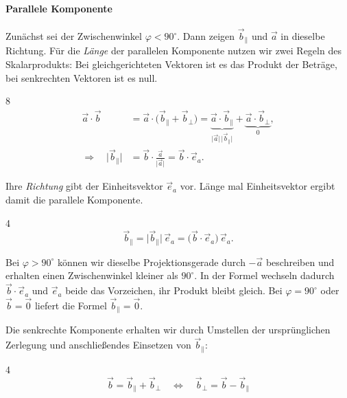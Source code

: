 \paragraph{Parallele Komponente}
Zunächst sei der Zwischenwinkel $\varphi<90^\circ$. Dann zeigen
$\vec b_{\parallel}$ und $\vec a$ in dieselbe Richtung.
Für die \emph{Länge} der parallelen Komponente nutzen wir zwei Regeln des
Skalarprodukts: Bei gleichgerichteten Vektoren ist es das Produkt der
Beträge, bei senkrechten Vektoren ist es null.
\begin{ClozeArea}[34]{8}
  \[
    \begin{aligned}
      \vec a\cdot\vec b
        &=\vec a\cdot\bigl(\vec b_{\parallel}+\vec b_{\perp}\bigr)
         =\underbrace{\vec a\cdot\vec b_{\parallel}}_{
            \lvert\vec a\rvert\,\lvert\vec b_{\parallel}\rvert}
          +\underbrace{\vec a\cdot\vec b_{\perp}}_{0}, \\[1em]
      \Longrightarrow\quad \lvert\vec b_{\parallel}\rvert
        &=\vec b\cdot\frac{\vec a}{\lvert\vec a\rvert}
         =\vec b\cdot\vec e_a.
    \end{aligned}
  \]
\end{ClozeArea}
Ihre \emph{Richtung} gibt der Einheitsvektor $\vec e_a$ vor. Länge mal
Einheitsvektor ergibt damit die parallele Komponente.
\begin{ClozeArea}[34]{4}
  \[
    \vec b_{\parallel}
      =\lvert\vec b_{\parallel}\rvert\,\vec e_a
      =\bigl(\vec b\cdot\vec e_a\bigr)\,\vec e_a.
  \]
\end{ClozeArea}

Bei $\varphi>90^\circ$ können wir dieselbe Projektionsgerade durch
$-\vec a$ beschreiben und erhalten einen Zwischenwinkel kleiner als
$90^\circ$. In der Formel wechseln dadurch $\vec b\cdot\vec e_a$ und
$\vec e_a$ beide das Vorzeichen, ihr Produkt bleibt gleich. Bei
$\varphi=90^\circ$ oder $\vec b=\vec 0$ liefert die Formel
$\vec b_{\parallel}=\vec 0$.

Die senkrechte Komponente erhalten wir durch Umstellen der ursprünglichen
Zerlegung und anschließendes Einsetzen von $\vec b_{\parallel}$:
\begin{ClozeArea}[34]{4}
  \[
    \vec b=\vec b_{\parallel}+\vec b_{\perp}
      \quad\Longleftrightarrow\quad
    \vec b_{\perp}
      =\vec b-\vec b_{\parallel}
  \]
\end{ClozeArea}

